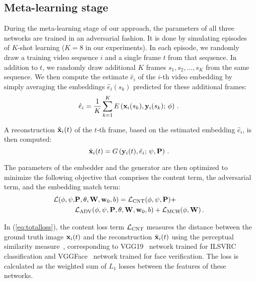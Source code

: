 \documentclass[10pt,twocolumn,letterpaper]{article}
\newcommand{\eq}[1]{(\ref{eq:#1})}
\newcommand{\e}{e}
\begin{document}
\subsection{Meta-learning stage}

During the meta-learning stage of our approach, the parameters of all three networks are trained in an adversarial fashion. It is done by simulating episodes of $K$-shot learning ($K=8$ in our experiments). In each episode, we randomly draw a training video sequence $i$ and a single frame $t$ from that sequence. In addition to $t$, we randomly draw additional $K$ frames $s_1,s_2,\dots,s_K$ from the same sequence. We then compute the estimate $\hat{\e}_i$ of the $i$-th video embedding by simply averaging the embeddings $\hat{\e}_i(s_k)$ predicted for these additional frames:
\begin{equation} \label{eq:embed}
    \hat\e_i = \frac{1}{K} \sum_{k=1}^K E\left(\x_i(s_k),\y_i(s_k);\,\phi\right)\,.
\end{equation}

A reconstruction $\hat{\mathbf{x}}_i(t)$ of the $t$-th frame, based on the estimated embedding $\hat\e_i$, is then computed:
\begin{equation} \label{eq:embed2}
    \hat\x_i(t) = G\left(\y_i(t),\hat\e_i;\,\psi,\P\right)\,.
\end{equation}

The parameters of the embedder and the generator are then optimized to minimize the following objective that comprises the content term, the adversarial term, and the embedding match term:
\begin{align} \label{eq:totalloss}
    \mathcal{L}(\phi,\psi,&\mathbf{P},\theta,\mathbf{W},\mathbf{w}_0,b) = \mathcal{L}_\text{CNT}(\phi,\psi,\mathbf{P}) + \\ &\mathcal{L}_\text{ADV}(\phi,\psi,\mathbf{P},\theta,\mathbf{W},\mathbf{w}_0,b)+\mathcal{L}_\text{MCH}(\phi, \mathbf{W})\,. \nonumber
\end{align}

In \eq{totalloss}, the content loss term $\mathcal{L}_\text{CNT}$ measures the distance between the ground truth image $\mathbf{x}_i(t)$ and the reconstruction $\hat{\mathbf{x}}_i(t)$ using the perceptual similarity measure~\cite{Johnson16}, corresponding to VGG19~\cite{Simonyan15} network trained for ILSVRC classification and VGGFace~\cite{Parkhi15} network trained for face verification. The loss is calculated as the weighted sum of $L_1$ losses between the features of these networks.
\end{document}
